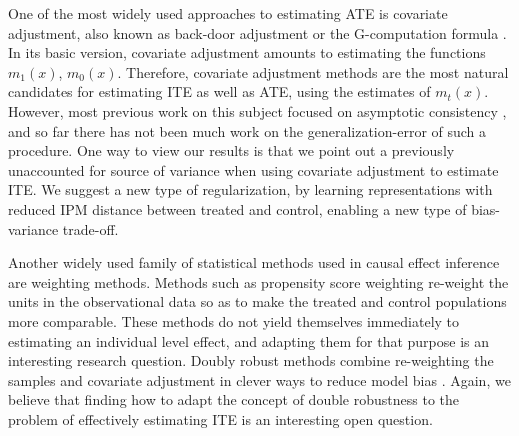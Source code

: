 One of the most widely used approaches to estimating ATE is covariate adjustment, also known as back-door adjustment or the G-computation formula \citep{pearl2009causality,rubin2011causal}. In its basic version, covariate adjustment amounts to estimating the functions $m_1(x)$, $m_0(x)$. Therefore, covariate adjustment methods are the most natural candidates for estimating ITE as well as ATE, using the estimates of $m_t(x)$. However, most previous work on this subject focused on asymptotic consistency \citep{belloni2014inference,athey2016efficient,chernozhukov2016double}, and so far there has not been much work on the generalization-error of such a procedure. One way to view our results is that we point out a previously unaccounted for source of variance when using covariate adjustment to estimate ITE. We suggest a new type of regularization, by learning representations with reduced IPM distance between treated and control, enabling a new type of bias-variance trade-off.

Another widely used family of statistical methods used in causal effect inference are weighting methods. Methods such as propensity score weighting \citep{austin2011introduction} re-weight the units in the observational data so as to make the treated and control populations more comparable. These methods do not yield themselves immediately to estimating an individual level effect, and adapting them for that purpose is an interesting research question.
Doubly robust methods combine re-weighting the samples and covariate adjustment in clever ways to reduce model bias \citep{funk2011doubly}. Again, we believe that finding how to adapt the concept of double robustness to the problem of effectively estimating ITE is an interesting open question.


